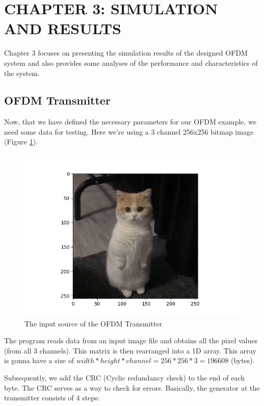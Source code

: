 \section*{CHAPTER 3: SIMULATION AND RESULTS}
\setcounter{section}{3}
\setcounter{subsection}{0}
\setcounter{figure}{0}
\setcounter{table}{0}

Chapter 3 focuses on presenting the simulation results of the designed OFDM system and also provides some analyses of the performance and characteristics of the system.

\subsection{OFDM Transmitter}
Now, that we have defined the necessary parameters for our OFDM example, we need some data for testing. Here we're using a 3 channel 256x256 bitmap image (Figure \ref{input}).

\begin{figure}[htbp]
    \centering
    \includegraphics[width=\textwidth]{../Source/results/input}
    \caption{The input source of the OFDM Transmitter}
    \label{input}
\end{figure}

The program reads data from an input image file and obtains all the pixel values (from all 3 channels). This matrix is then rearranged into a 1D array. This array is gonna have a size of $width*height*channel = 256*256*3 = 196608$ (bytes).

Subsequently, we add the CRC (Cyclic redundancy check) \cite{crc} to the end of each byte. The CRC serves as a way to check for errors. Basically, the  generator at the transmitter consists of 4 steps:

